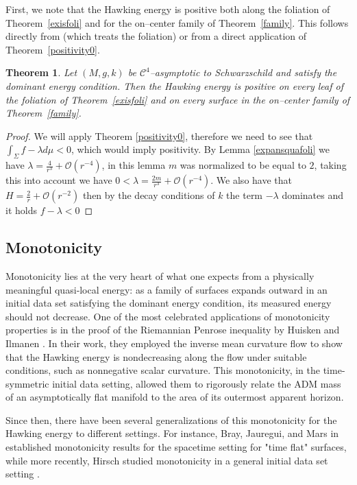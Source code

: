 \documentclass[12pt,a4paper]{amsart}
\theoremstyle{plain}
\newtheorem{theorem}{Theorem}[section]
\theoremstyle{definition}
\begin{document}
First, we note that the Hawking energy is positive both along the foliation of Theorem~\ref{exisfoli} and for the on–center family of Theorem~\ref{family}. This follows directly from \cite[Theorem~2.2]{diaz2023local} (which treats the foliation) or from a direct application of Theorem~\ref{positivity0}.
\begin{theorem}\label{positivity}
Let $(M,g,k)$ be $ \mathcal{C}^4$–asymptotic to Schwarzschild and satisfy the dominant energy condition. Then the Hawking energy is positive on every leaf of the foliation of Theorem~\ref{exisfoli} and on every surface in the on–center family of Theorem~\ref{family}.
\end{theorem}
\begin{proof}
    We will apply Theorem \ref{positivity0}, therefore we need to see that $\int_\Sigma f-\lambda d\mu < 0$, which would imply positivity. By  Lemma \ref{expansquafoli}  we have $\lambda =\frac{4}{r^3} +\mathcal{O}(r^{-4}) $, in this lemma  $m$ was normalized to be equal to $2$, taking this into account we have  $0<\lambda =\frac{2m}{r^3} +\mathcal{O}(r^{-4})$. We also have that  $ H= \frac{2}{r} +\mathcal{O}(r^{-2})$ then by the decay conditions of $k$  the term $-\lambda$ dominates and it holds  $f-\lambda < 0$
\end{proof}
\subsection{Monotonicity}

Monotonicity lies at the very heart of what one expects from a physically meaningful quasi‐local energy: as a family of surfaces expands outward in an initial data set satisfying the dominant energy condition, its measured energy should not decrease. One of the most celebrated applications of monotonicity properties is in the proof of the Riemannian Penrose inequality by Huisken and Ilmanen \cite{huisken2001inverse}. In their  work, they employed the inverse mean curvature flow to show that the Hawking energy is nondecreasing along the flow under suitable conditions, such as nonnegative scalar curvature. This monotonicity, in the time-symmetric initial data setting, allowed them to rigorously relate the ADM mass of an asymptotically flat manifold to the area of its outermost apparent horizon.

Since then, there have been several generalizations of this monotonicity for the Hawking energy to different settings. For instance, Bray, Jauregui, and Mars in \cite{bray2015time,bray2016time} established monotonicity results for the spacetime setting for "time flat" surfaces, while more recently, Hirsch studied monotonicity in a general initial data set setting \cite{hirsch2022hawking}.
\end{document}
